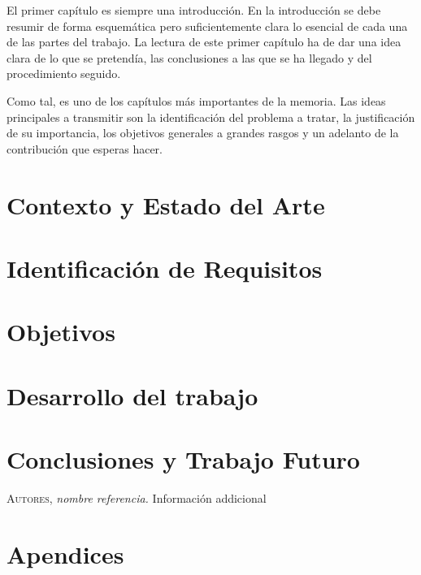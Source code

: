 \documentclass[11pt,a4paper,spanish]{book}
\begin{document}
El primer capítulo es siempre una introducción. En la introducción se debe resumir de forma esquemática pero suficientemente clara lo esencial de cada una de las partes del trabajo. La lectura de este primer capítulo ha de dar una idea clara de lo que se pretendía, las conclusiones a las que se ha llegado y del procedimiento seguido.

Como tal, es uno de los capítulos más importantes de la memoria. Las ideas principales a transmitir son la identificación del problema a tratar, la justificación de su importancia, los objetivos generales a grandes rasgos y un adelanto de la contribución que esperas hacer.



\chapter{Contexto y Estado del Arte}

\chapter{Identificación de Requisitos}

\chapter{Objetivos}

\chapter{Desarrollo del trabajo}

\chapter{Conclusiones y Trabajo Futuro}

\begin{thebibliography}{a}
 \textsc{Autores},
\textit{nombre referencia.}
Información addicional
\end{thebibliography}
% 
%

\appendix
\chapter{Apendices}
\end{document}
